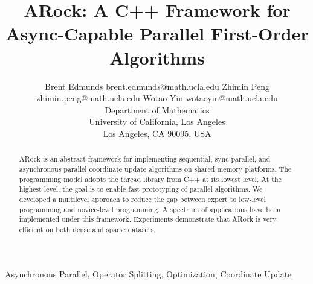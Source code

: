 \documentclass[twoside,11pt]{article}
\begin{document}
\title{ARock: A C++ Framework for Async-Capable Parallel First-Order Algorithms}

\author{\name Brent Edmunds \email brent.edmunds@math.ucla.edu
       \AND
       \name Zhimin Peng \email zhimin.peng@math.ucla.edu
       \AND
	\name Wotao Yin \email wotaoyin@math.ucla.edu \\
       \addr Department of Mathematics\\
       University of California, Los Angeles\\
       Los Angeles, CA 90095, USA}	

\maketitle

\begin{abstract}
ARock is an abstract framework for implementing sequential, sync-parallel, and asynchronous parallel coordinate update algorithms on shared memory platforms. 
The programming model adopts the thread library from C++ at its lowest level. At the highest level, the goal is to enable fast prototyping of parallel algorithms. 
We developed a multilevel approach to reduce the gap between expert to low-level programming and novice-level programming. 
A spectrum of applications have been implemented under this framework. 
Experiments demonstrate that ARock is very efficient on both dense and sparse datasets. 
\end{abstract}

\begin{keywords}
  Asynchronous Parallel, Operator Splitting, Optimization, Coordinate Update
\end{keywords}








%

%

%


% 


% 


% 




\end{document}

